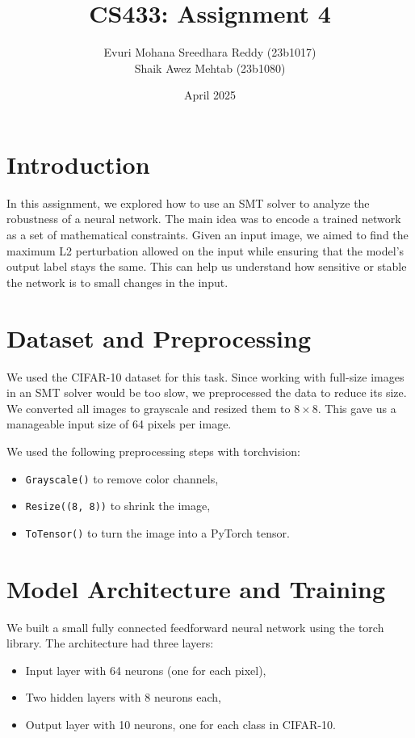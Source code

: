 \documentclass{article}
\title{CS433: Assignment 4}
\author{Evuri Mohana Sreedhara Reddy (23b1017) \\ Shaik Awez Mehtab (23b1080)}
\date{April 2025}
\begin{document}
\maketitle

\section{Introduction}
In this assignment, we explored how to use an SMT solver to analyze the robustness of a neural network. The main idea was to encode a trained network as a set of mathematical constraints. Given an input image, we aimed to find the maximum L2 perturbation allowed on the input while ensuring that the model's output label stays the same. This can help us understand how sensitive or stable the network is to small changes in the input.

\section{Dataset and Preprocessing}
We used the CIFAR-10 dataset for this task. Since working with full-size images in an SMT solver would be too slow, we preprocessed the data to reduce its size. We converted all images to grayscale and resized them to $8 \times 8$. This gave us a manageable input size of 64 pixels per image.

We used the following preprocessing steps with torchvision:
\begin{itemize}
    \item \texttt{Grayscale()} to remove color channels,
    \item \texttt{Resize((8, 8))} to shrink the image,
    \item \texttt{ToTensor()} to turn the image into a PyTorch tensor.
\end{itemize}

\section{Model Architecture and Training}
We built a small fully connected feedforward neural network using the torch library. The architecture had three layers:
\begin{itemize}
    \item Input layer with 64 neurons (one for each pixel),
    \item Two hidden layers with 8 neurons each,
    \item Output layer with 10 neurons, one for each class in CIFAR-10.
\end{itemize}
\end{document}
